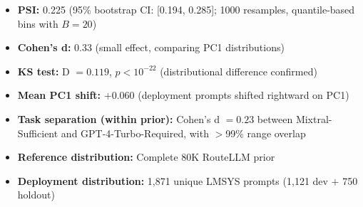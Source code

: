 \begin{itemize}[leftmargin=*,noitemsep,topsep=2pt]
    \item \textbf{PSI:} 0.225 (95\% bootstrap CI: [0.194, 0.285]; 1000 resamples, quantile-based bins with $B=20$)
    \item \textbf{Cohen's d:} 0.33 (small effect, comparing PC1 distributions)
    \item \textbf{KS test:} D $= 0.119$, $p < 10^{-22}$ (distributional difference confirmed)
    \item \textbf{Mean PC1 shift:} $+0.060$ (deployment prompts shifted rightward on PC1)
    \item \textbf{Task separation (within prior):} Cohen's d $= 0.23$ between Mixtral-Sufficient and GPT-4-Turbo-Required, with $>$99\% range overlap
    \item \textbf{Reference distribution:} Complete 80K RouteLLM prior
    \item \textbf{Deployment distribution:} 1,871 unique LMSYS prompts (1,121 dev $+$ 750 holdout)
\end{itemize}
